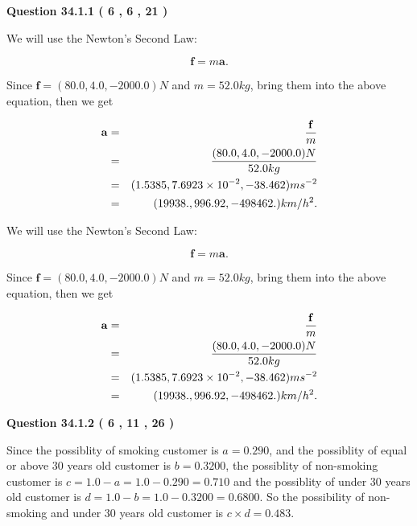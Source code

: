 \documentclass[12pt]{article}
\begin{document}
{\textbf{\Large{Question
34.1.1 
 (           6 ,           6 ,          21 )
}}}
  
  
 
 
\noindent{}

We will use the Newton's Second Law:
 
\[
\mathbf{f}=m\mathbf{a}.
\]
 
Since $\mathbf{f}=( %
80.0,  %
4.0,  %
-2000.0 )N$
and $m= %
52.0 kg$, bring them into the above equation, then we get
 
\begin{eqnarray*}
\mathbf{a}&=&\frac{\mathbf{f}}m  \\
&=&\frac{(
80.0 ,
4.0 ,
-2000.0 )N
}{ %
52.0 kg}  \\
&=&(
1.5385 ,
7.6923 \times 10^{-2},
-38.462
)ms^{-2} \\
&=&(
19938. ,
996.92 ,
-498462.
)km/h^2.
\end{eqnarray*}
 
 
 
 
 
\noindent{}

We will use the Newton's Second Law:
 
\[
\mathbf{f}=m\mathbf{a}.
\]
 
Since $\mathbf{f}=( %
80.0,  %
4.0,  %
-2000.0 )N$
and $m= %
52.0 kg$, bring them into the above equation, then we get
 
\begin{eqnarray*}
\mathbf{a}&=&\frac{\mathbf{f}}m  \\
&=&\frac{(
80.0 ,
4.0 ,
-2000.0 )N
}{ %
52.0 kg}  \\
&=&(
1.5385 ,
7.6923 \times 10^{-2},
-38.462
)ms^{-2} \\
&=&(
19938. ,
996.92 ,
-498462.
)km/h^2.
\end{eqnarray*}
 
 
 
  
\vspace{0.2in}
  
{\textbf{\Large{Question
34.1.2 
 (           6 ,          11 ,          26 )
}}}
  
  
 
 
\noindent{}

Since the possiblity of  %
smoking customer is $ a =  %
0.290 $,
and the possiblity of  %
equal or above 30 years old customer is $ b =  %
0.3200 $,
the possiblity of  %
non-smoking customer is $ c = 1.0 - a = 1.0 -
0.290
=  %
0.710 $ and the possiblity of  %
under 30 years old
customer is $ d = 1.0 - b = 1.0 -  %
0.3200 =  %
0.6800  $.
So the possibility of  %
 non-smoking and  %
under 30 years old
customer is $ c \times d =  %
0.483 $.
 
\end{document}

